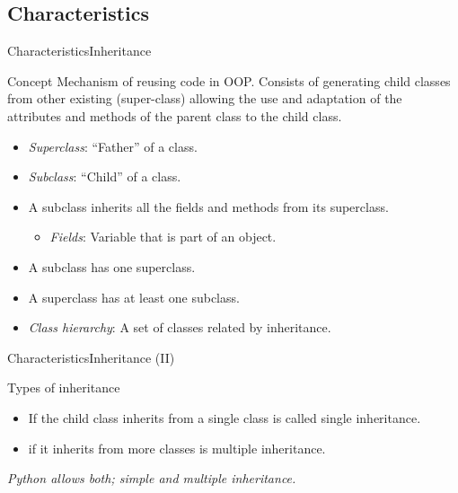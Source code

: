 \documentclass[10pt,compress]{beamer} %
\begin{document}
\subsection{Characteristics}

\begin{frame}{Characteristics}{Inheritance}
\vspace{-0.2cm}
	\begin{block}{Concept}
	Mechanism of \alert{reusing} code in OOP. Consists of generating child classes from other existing (\alert{super-class}) allowing the use and adaptation of the attributes and methods of the parent class to the child class. 
  	\end{block}	
\vspace{-0.2cm}
\begin{block}{}
\begin{itemize}
		\item \small{\textit{Superclass}: ``Father'' of a class.}
		\item \small{\textit{Subclass}: ``Child'' of a class.}
		\item \small{A subclass inherits all the fields and methods from its superclass.}
		\begin{itemize}
		\item \footnotesize \textit{Fields}: Variable that is part of an object.
		\end{itemize}
		\item \small{A subclass has \alert{one} superclass.}
		\item \small{A superclass has \alert{at least one} subclass.}
		\item \small{\textit{Class hierarchy}: A set of classes related by inheritance.}
\end{itemize}
	\end{block}
\end{frame}

\begin{frame}{Characteristics}{Inheritance (II)}

	\begin{block}{Types of inheritance}
	\begin{itemize}
		\item If the child class inherits from a single class is called \alert{single inheritance}.
		\item if it inherits from more classes is \alert{multiple inheritance}.
	\end{itemize}
	\end{block}
	\medskip
	   \textit{Python allows both; simple and multiple inheritance.}
\end{frame}
\end{document}
